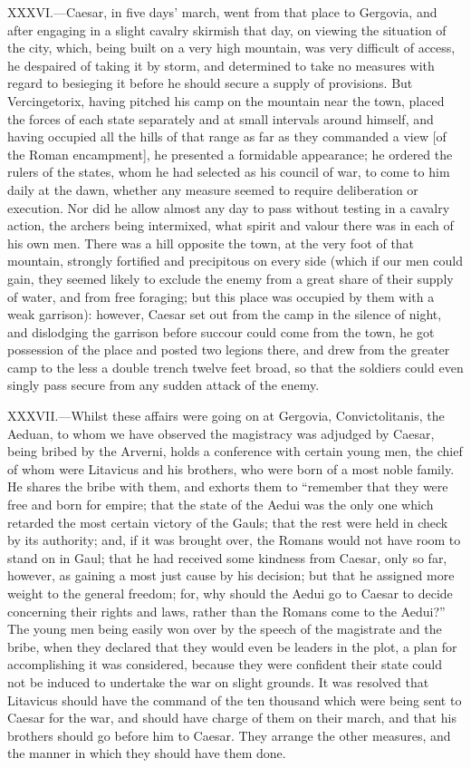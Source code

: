 XXXVI.—Caesar, in five days' march, went from that place to Gergovia,
and after engaging in a slight cavalry skirmish that day, on viewing the
situation of the city, which, being built on a very high mountain, was
very difficult of access, he despaired of taking it by storm, and
determined to take no measures with regard to besieging it before he
should secure a supply of provisions. But Vercingetorix, having pitched
his camp on the mountain near the town, placed the forces of each state
separately and at small intervals around himself, and having occupied
all the hills of that range as far as they commanded a view [of the
Roman encampment], he presented a formidable appearance; he ordered the
rulers of the states, whom he had selected as his council of war, to
come to him daily at the dawn, whether any measure seemed to require
deliberation or execution. Nor did he allow almost any day to pass
without testing in a cavalry action, the archers being intermixed, what
spirit and valour there was in each of his own men. There was a hill
opposite the town, at the very foot of that mountain, strongly fortified
and precipitous on every side (which if our men could gain, they seemed
likely to exclude the enemy from a great share of their supply of water,
and from free foraging; but this place was occupied by them with a weak
garrison): however, Caesar set out from the camp in the silence of
night, and dislodging the garrison before succour could come from the
town, he got possession of the place and posted two legions there, and
drew from the greater camp to the less a double trench twelve feet
broad, so that the soldiers could even singly pass secure from any
sudden attack of the enemy.

XXXVII.—Whilst these affairs were going on at Gergovia,
Convictolitanis, the Aeduan, to whom we have observed the magistracy was
adjudged by Caesar, being bribed by the Arverni, holds a conference with
certain young men, the chief of whom were Litavicus and his brothers,
who were born of a most noble family. He shares the bribe with them, and
exhorts them to ``remember that they were free and born for empire; that
the state of the Aedui was the only one which retarded the most certain
victory of the Gauls; that the rest were held in check by its authority;
and, if it was brought over, the Romans would not have room to stand on
in Gaul; that he had received some kindness from Caesar, only so far,
however, as gaining a most just cause by his decision; but that he
assigned more weight to the general freedom; for, why should the Aedui
go to Caesar to decide concerning their rights and laws, rather than the
Romans come to the Aedui?'' The young men being easily won over by the
speech of the magistrate and the bribe, when they declared that they
would even be leaders in the plot, a plan for accomplishing it was
considered, because they were confident their state could not be induced
to undertake the war on slight grounds. It was resolved that Litavicus
should have the command of the ten thousand which were being sent to
Caesar for the war, and should have charge of them on their march, and
that his brothers should go before him to Caesar. They arrange the other
measures, and the manner in which they should have them done.

